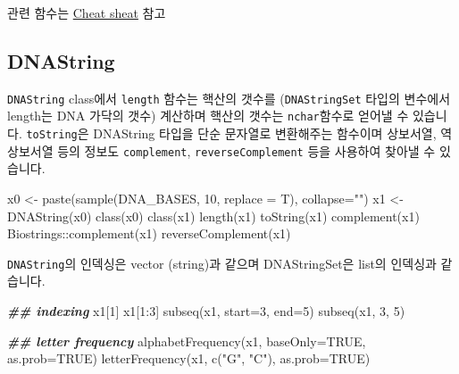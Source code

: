 \documentclass[
]{book}
\newenvironment{Shaded}{\begin{snugshade}}{\end{snugshade}}
\newcommand{\AttributeTok}[1]{\textcolor[rgb]{0.77,0.63,0.00}{#1}}
\newcommand{\ConstantTok}[1]{\textcolor[rgb]{0.00,0.00,0.00}{#1}}
\newcommand{\DecValTok}[1]{\textcolor[rgb]{0.00,0.00,0.81}{#1}}
\newcommand{\DocumentationTok}[1]{\textcolor[rgb]{0.56,0.35,0.01}{\textbf{\textit{#1}}}}
\newcommand{\FunctionTok}[1]{\textcolor[rgb]{0.00,0.00,0.00}{#1}}
\newcommand{\NormalTok}[1]{#1}
\newcommand{\OtherTok}[1]{\textcolor[rgb]{0.56,0.35,0.01}{#1}}
\newcommand{\SpecialCharTok}[1]{\textcolor[rgb]{0.00,0.00,0.00}{#1}}
\newcommand{\StringTok}[1]{\textcolor[rgb]{0.31,0.60,0.02}{#1}}
\begin{document}
관련 함수는 \href{http://bioconductor.org/packages/release/bioc/vignettes/Biostrings/inst/doc/BiostringsQuickOverview.pdf}{Cheat sheat} 참고

\hypertarget{dnastring}{%
\subsection{DNAString}\label{dnastring}}

\texttt{DNAString} class에서 \texttt{length} 함수는 핵산의 갯수를 (\texttt{DNAStringSet} 타입의 변수에서 length는 DNA 가닥의 갯수) 계산하며 핵산의 갯수는 \texttt{nchar}함수로 얻어낼 수 있습니다. \texttt{toString}은 DNAString 타입을 단순 문자열로 변환해주는 함수이며 상보서열, 역상보서열 등의 정보도 \texttt{complement}, \texttt{reverseComplement} 등을 사용하여 찾아낼 수 있습니다.

\begin{Shaded}
\begin{Highlighting}[]
\NormalTok{x0 }\OtherTok{\textless{}{-}} \FunctionTok{paste}\NormalTok{(}\FunctionTok{sample}\NormalTok{(DNA\_BASES, }\DecValTok{10}\NormalTok{, }\AttributeTok{replace =}\NormalTok{ T), }\AttributeTok{collapse=}\StringTok{""}\NormalTok{)}
\NormalTok{x1 }\OtherTok{\textless{}{-}} \FunctionTok{DNAString}\NormalTok{(x0)}
\FunctionTok{class}\NormalTok{(x0)}
\FunctionTok{class}\NormalTok{(x1)}
\FunctionTok{length}\NormalTok{(x1)}
\FunctionTok{toString}\NormalTok{(x1)}
\FunctionTok{complement}\NormalTok{(x1)}
\NormalTok{Biostrings}\SpecialCharTok{::}\FunctionTok{complement}\NormalTok{(x1)}
\FunctionTok{reverseComplement}\NormalTok{(x1)}
\end{Highlighting}
\end{Shaded}

\texttt{DNAString}의 인덱싱은 vector (string)과 같으며 DNAStringSet은 list의 인덱싱과 같습니다.

\begin{Shaded}
\begin{Highlighting}[]
\DocumentationTok{\#\# indexing}
\NormalTok{x1[}\DecValTok{1}\NormalTok{]}
\NormalTok{x1[}\DecValTok{1}\SpecialCharTok{:}\DecValTok{3}\NormalTok{]}
\FunctionTok{subseq}\NormalTok{(x1, }\AttributeTok{start=}\DecValTok{3}\NormalTok{, }\AttributeTok{end=}\DecValTok{5}\NormalTok{)}
\FunctionTok{subseq}\NormalTok{(x1, }\DecValTok{3}\NormalTok{, }\DecValTok{5}\NormalTok{)}

\DocumentationTok{\#\# letter frequency}
\FunctionTok{alphabetFrequency}\NormalTok{(x1, }\AttributeTok{baseOnly=}\ConstantTok{TRUE}\NormalTok{, }\AttributeTok{as.prob=}\ConstantTok{TRUE}\NormalTok{)}
\FunctionTok{letterFrequency}\NormalTok{(x1, }\FunctionTok{c}\NormalTok{(}\StringTok{"G"}\NormalTok{, }\StringTok{"C"}\NormalTok{), }\AttributeTok{as.prob=}\ConstantTok{TRUE}\NormalTok{)}
\end{Highlighting}
\end{Shaded}
\end{document}
